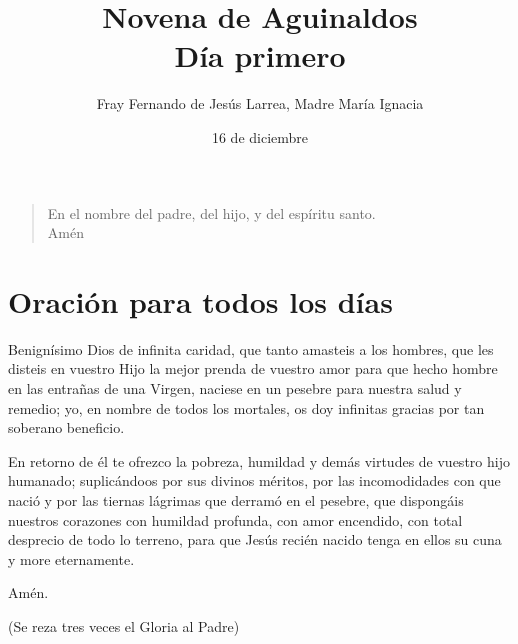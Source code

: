 \documentclass[spanish,utf8,12pt]{chlart}
\title{Novena de Aguinaldos\\Día primero}
\author{Fray Fernando de Jesús Larrea, Madre María Ignacia}
\date{16 de diciembre}
\newenvironment{lectura}{\begingroup\color{lector}}{\endgroup\par}
\newenvironment{finalnotes}{\begingroup
	\footnotesize\sffamily\color{Gray}%
	\setlength{\leftskip}{3em}\setlength{\rightskip}{3em}\noindent
	}{\par\endgroup}
\newenvironment{gozo}{\begin{verse}\color{lector}}{\end{verse}}
\begin{document}
\maketitle

\begin{gozo}
En el nombre del padre, del hijo, y del espíritu santo.\\Amén
\end{gozo}
\section{Oración para todos los días}

\begin{lectura}
Benignísimo Dios de infinita caridad, que tanto amasteis a los hombres,
que les disteis en vuestro Hijo la mejor prenda de vuestro amor para que
hecho hombre en las entrañas de una Virgen, naciese en un pesebre para
nuestra salud y remedio; yo, en nombre de todos los mortales, os doy
infinitas gracias por tan soberano beneficio.

En retorno de él te ofrezco la pobreza, humildad y demás virtudes de
vuestro hijo humanado; suplicándoos por sus divinos méritos, por las
incomodidades con que nació y por las tiernas lágrimas que derramó en
el pesebre, que dispongáis nuestros corazones con humildad profunda,
con amor encendido, con total desprecio de todo lo terreno, para que
Jesús recién nacido tenga en ellos su cuna y more eternamente.

Amén.
\end{lectura}
\begin{finalnotes}
(Se reza tres veces el Gloria al Padre)
\end{finalnotes}
\end{document}
